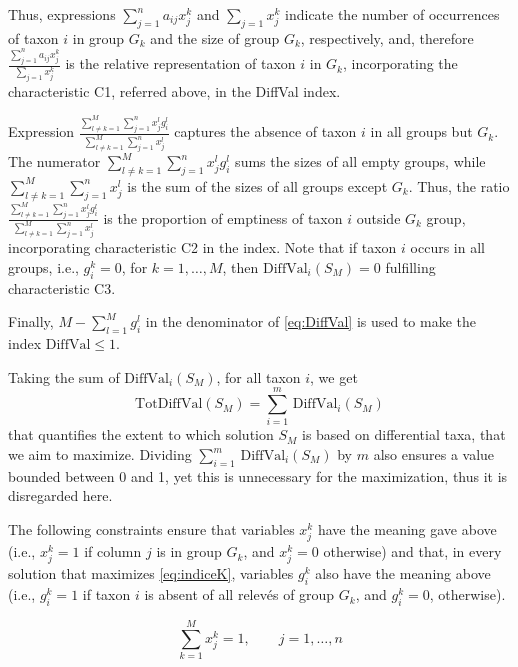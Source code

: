 Thus, expressions \(\sum_{j=1}^n a_{ij} x_j^k\) and \(\sum_{j=1}x_j^k\) indicate the number of occurrences of taxon \(i\) in group \(G_k\) and the size of group \(G_k\), respectively, and, therefore \(\frac{\sum_{j=1}^n a_{ij} x_j^k}{\sum_{j=1}x_j^k}\) is the relative representation of taxon \(i\) in \(G_k\), incorporating the characteristic C1, referred above, in the DiffVal index.

Expression \(\frac{\sum_{l\not=k=1}^M\sum_{j=1}^n  x_j^l g_i^l} {\sum_{l\not=k=1}^M\sum_{j=1}^n x_j^l}\) captures the absence of taxon \(i\) in all groups but \(G_k\). The numerator \(\sum_{l\not=k=1}^M\sum_{j=1}^n  x_j^l g_i^l\) sums the sizes of all empty groups, while \(\sum_{l\not=k=1}^M\sum_{j=1}^n  x_j^l\) is the sum of the sizes of all groups except \(G_k\). Thus, the ratio \(\frac{\sum_{l\not=k=1}^M\sum_{j=1}^n  x_j^l g_i^l} {\sum_{l\not=k=1}^M\sum_{j=1}^n x_j^l}\) is the proportion of emptiness of taxon \(i\) outside \(G_k\) group, incorporating characteristic C2 in the index. Note that if taxon \(i\) occurs in all groups, i.e., \(g_i^k=0\), for \(k=1,\dots,M\), then \(\mathrm{DiffVal}_i(S_M)=0\) fulfilling characteristic C3.

Finally, \({M-\sum_{l=1}^M g_i^l}\) in the denominator of \eqref{eq:DiffVal} is used to make the index \(\mathrm{DiffVal}\leq 1\).

Taking the sum of \(\mathrm{DiffVal}_i(S_M)\), for all taxon \(i\), we get
\begin{equation}
\mathrm{TotDiffVal}(S_M)= \sum_{i=1}^m \, \mathrm{DiffVal}_i(S_M)
\label{eq:indiceK}
\end{equation}
that quantifies the extent to which solution \(S_M\) is based on differential taxa, that we aim to maximize. Dividing \(\sum_{i=1}^m \, \mathrm{DiffVal}_i(S_M)\) by \(m\) also ensures a value bounded between 0 and 1, yet this is unnecessary for the maximization, thus it is disregarded here.

The following constraints ensure that variables \(x_j^k\) have the meaning gave above (i.e., \(x_j^k=1\) if column \(j\) is in group \(G_k\), and \(x_j^k=0\) otherwise) and that, in every solution that maximizes \eqref{eq:indiceK}, variables \(g_i^k\) also have the meaning above (i.e., \(g_i^k=1\) if taxon \(i\) is absent of all relevés of group \(G_k\), and \(g_i^k=0\), otherwise).

\begin{equation}
\sum_{k=1}^M x_j^k=1, \quad \quad j=1,\dots,n
\label{eq:kpartition1}
\end{equation}

